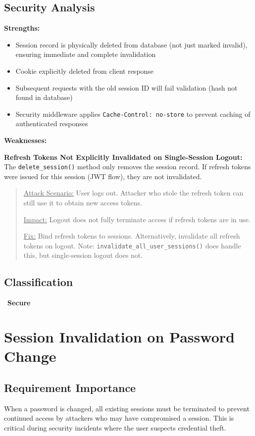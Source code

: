 \documentclass[11pt,a4paper]{article}
\newcommand{\secure}{\textcolor{securegreen}{\checkmark~\textbf{Secure}}}
\begin{document}
\subsection{Security Analysis}

\textbf{Strengths:}
\begin{itemize}[noitemsep]
    \item Session record is physically deleted from database (not just marked invalid), ensuring immediate and complete invalidation
    \item Cookie explicitly deleted from client response
    \item Subsequent requests with the old session ID will fail validation (hash not found in database)
    \item Security middleware applies \texttt{Cache-Control: no-store} to prevent caching of authenticated responses
\end{itemize}

\textbf{Weaknesses:}

\textbf{Refresh Tokens Not Explicitly Invalidated on Single-Session Logout:} The \texttt{delete\_session()} method only removes the session record. If refresh tokens were issued for this session (JWT flow), they are not invalidated.

\begin{quote}
\underline{Attack Scenario:} User logs out. Attacker who stole the refresh token can still use it to obtain new access tokens.

\underline{Impact:} Logout does not fully terminate access if refresh tokens are in use.

\underline{Fix:} Bind refresh tokens to sessions. Alternatively, invalidate all refresh tokens on logout. Note: \texttt{invalidate\_all\_user\_sessions()} does handle this, but single-session logout does not.
\end{quote}

\subsection{Classification}
\secure

\newpage
\section{Session Invalidation on Password Change}

\subsection{Requirement Importance}
When a password is changed, all existing sessions must be terminated to prevent continued access by attackers who may have compromised a session. This is critical during security incidents where the user suspects credential theft.
\end{document}
